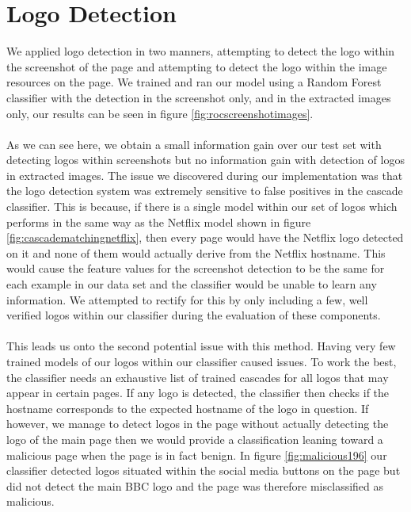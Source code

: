 \documentclass[12pt,twoside]{report}
\begin{document}
\section{Logo Detection}\label{logoevaluation}
We applied logo detection in two manners, attempting to detect the logo within the screenshot of the page and attempting to detect the logo within the image resources on the page. We trained and ran our model using a Random Forest classifier with the detection in the screenshot only, and in the extracted images only, our results can be seen in figure \ref{fig:rocscreenshotimages}.
\\\\
As we can see here, we obtain a small information gain over our test set with detecting logos within screenshots but no information gain with detection of logos in extracted images. The issue we discovered during our implementation was that the logo detection system was extremely sensitive to false positives in the cascade classifier. This is because, if there is a single model within our set of logos which performs in the same way as the Netflix model shown in figure \ref{fig:cascadematchingnetflix}, then every page would have the Netflix logo detected on it and none of them would actually derive from the Netflix hostname. This would cause the feature values for the screenshot detection to be the same for each example in our data set and the classifier would be unable to learn any information. We attempted to rectify for this by only including a few, well verified logos within our classifier during the evaluation of these components.
\\\\
This leads us onto the second potential issue with this method. Having very few trained models of our logos within our classifier caused issues. To work the best, the classifier needs an exhaustive list of trained cascades for all logos that may appear in certain pages. If any logo is detected, the classifier then checks if the hostname corresponds to the expected hostname of the logo in question. If however, we manage to detect logos in the page without actually detecting the logo of the main page then we would provide a classification leaning toward a malicious page when the page is in fact benign. In figure \ref{fig:malicious196} our classifier detected logos situated within the social media buttons on the page but did not detect the main BBC logo and the page was therefore misclassified as malicious.
\\\\
\end{document}
